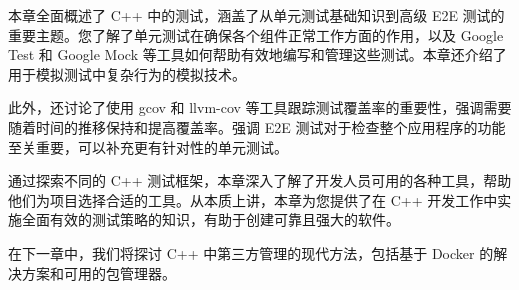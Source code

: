 
本章全面概述了 C++ 中的测试，涵盖了从单元测试基础知识到高级 E2E 测试的重要主题。您了解了单元测试在确保各个组件正常工作方面的作用，以及 Google Test 和 Google Mock 等工具如何帮助有效地编写和管理这些测试。本章还介绍了用于模拟测试中复杂行为的模拟技术。

此外，还讨论了使用 gcov 和 llvm-cov 等工具跟踪测试覆盖率的重要性，强调需要随着时间的推移保持和提高覆盖率。强调 E2E 测试对于检查整个应用程序的功能至关重要，可以补充更有针对性的单元测试。

通过探索不同的 C++ 测试框架，本章深入了解了开发人员可用的各种工具，帮助他们为项目选择合适的工具。从本质上讲，本章为您提供了在 C++ 开发工作中实施全面有效的测试策略的知识，有助于创建可靠且强大的软件。

在下一章中，我们将探讨 C++ 中第三方管理的现代方法，包括基于 Docker 的解决方案和可用的包管理器。
